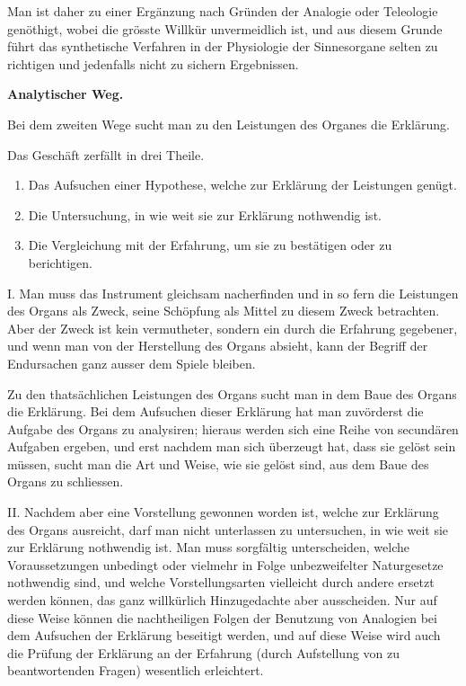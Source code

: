\documentclass[12pt,a4paper]{article}
\begin{document}
Man ist daher zu einer Erg\"anzung nach Gr\"unden der Analogie oder Teleologie gen\"othigt, wobei die gr\"osste Willk\"ur unvermeidlich ist, und aus diesem Grunde f\"uhrt das synthetische Verfahren in der Physiologie der Sinnesorgane selten zu richtigen und jedenfalls nicht zu sichern Ergebnissen.

\textbf{Analytischer Weg.}

Bei dem zweiten Wege sucht man zu den Leistungen des Organes die Erkl\"arung.

Das Gesch\"aft zerf\"allt in drei Theile.

\begin{enumerate}
\item Das Aufsuchen einer Hypothese, welche zur Erkl\"arung der Leistungen gen\"ugt.
\item Die Untersuchung, in wie weit sie zur Erkl\"arung nothwendig ist.
\item Die Vergleichung mit der Erfahrung, um sie zu best\"atigen oder zu berichtigen.
\end{enumerate}

I. Man muss das Instrument gleichsam nacherfinden und in so fern die Leistungen des Organs als Zweck, seine Sch\"opfung als Mittel zu diesem Zweck betrachten. Aber der Zweck ist kein vermutheter, sondern ein durch die Erfahrung gegebener, und wenn man von der Herstellung des Organs absieht, kann der Begriff der Endursachen ganz ausser dem Spiele bleiben.

Zu den thats\"achlichen Leistungen des Organs sucht man in dem Baue des Organs die Erkl\"arung. Bei dem Aufsuchen dieser Erkl\"arung hat man zuv\"orderst die Aufgabe des Organs zu analysiren; hieraus werden sich eine Reihe von secund\"aren Aufgaben ergeben, und erst nachdem man sich \"uberzeugt hat, dass sie gel\"ost sein m\"ussen, sucht man die Art und Weise, wie sie gel\"ost sind, aus dem Baue des Organs zu schliessen.

II. Nachdem aber eine Vorstellung gewonnen worden ist, welche zur Erkl\"arung des Organs ausreicht, darf man nicht unterlassen zu untersuchen, in wie weit sie zur Erkl\"arung nothwendig ist. Man muss sorgf\"altig unterscheiden, welche Voraussetzungen unbedingt oder vielmehr in Folge unbezweifelter Naturgesetze nothwendig sind, und welche Vorstellungsarten vielleicht durch andere ersetzt werden k\"onnen, das ganz willk\"urlich Hinzugedachte aber ausscheiden. Nur auf diese Weise k\"onnen die nachtheiligen Folgen der Benutzung von Analogien bei dem Aufsuchen der Erkl\"arung beseitigt werden, und auf diese Weise wird auch die Pr\"ufung der Erkl\"arung an der Erfahrung (durch Aufstellung von zu beantwortenden Fragen) wesentlich erleichtert.
\end{document}
